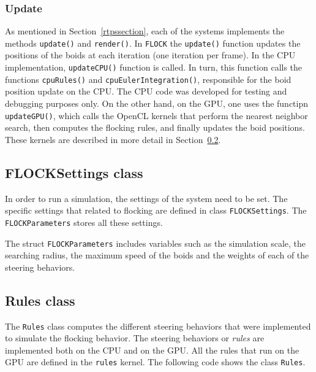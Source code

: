 \subsubsection{Update}
As mentioned in Section~\ref{rtpssection}, each of the systems implements
the methods \texttt{update()} and \texttt{render()}. 
In \texttt{FLOCK} the \texttt{update()} function updates the positions 
of the boids at each iteration (one iteration per frame). In the CPU 
implementation, \texttt{updateCPU()} function is called. In turn, this 
function calls
the functions \texttt{cpuRules()} and \texttt{cpuEulerIntegration()}, 
responsible for the boid position update on the CPU.   
The CPU code was developed for testing and debugging purposes only. 
On the other hand, on the GPU, one uses the functipn 
\texttt{updateGPU()}, which calls the OpenCL kernels that perform 
the nearest neighbor search, then computes the flocking rules, 
and finally updates the boid positions. 
These kernels are described in more detail in Section~\ref{rulesclass}.


\subsection{FLOCKSettings class}
In order to run a simulation, the settings of the system need to be set. 
The specific settings that related to flocking are defined in class \texttt{FLOCKSettings}. 
The \texttt{FLOCKParameters} stores all these settings. 

The struct \texttt{FLOCKParameters} includes variables such as the simulation scale, 
the searching radius, the maximum speed of the boids and the weights of each of the 
steering behaviors. 

\subsection{Rules class}\label{rulesclass}
The \texttt{Rules} class computes the different steering behaviors that were implemented to 
simulate the flocking behavior. The steering behaviors or \textit{rules} are implemented both on the 
CPU and on the GPU. All the rules that run on the GPU are defined in the \texttt{rules} kernel. 
The following code shows  the class \texttt{Rules}.

